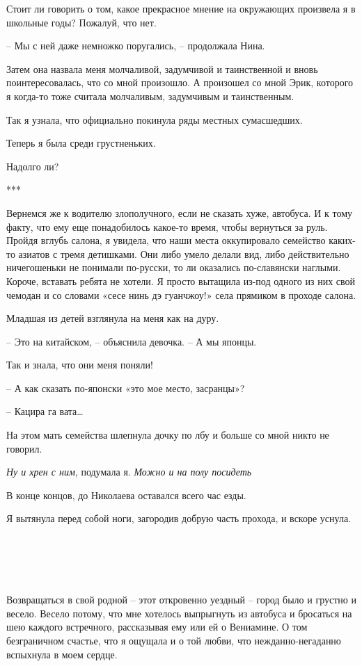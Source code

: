 \documentclass[
]{book}
\begin{document}
Стоит ли говорить о том, какое прекрасное мнение на окружающих произвела я в школьные годы? Пожалуй, что нет.

-- Мы с ней даже немножко поругались, -- продолжала Нина.

Затем она назвала меня молчаливой, задумчивой и таинственной и вновь поинтересовалась, что со мной произошло. А произошел со мной Эрик, которого я когда-то тоже считала молчаливым, задумчивым и таинственным.

Так я узнала, что официально покинула ряды местных сумасшедших.

Теперь я была среди грустненьких.

Надолго ли?

***

Вернемся же к водителю злополучного, если не сказать хуже, автобуса. И к тому факту, что ему еще понадобилось какое-то время, чтобы вернуться за руль. Пройдя вглубь салона, я увидела, что наши места оккупировало семейство каких-то азиатов с тремя детишками. Они либо умело делали вид, либо действительно ничегошеньки не понимали по-русски, то ли оказались по-славянски наглыми. Короче, вставать ребята не хотели. Я просто вытащила из-под одного из них свой чемодан и со словами «сесе нинь дэ гуанчжоу!» села прямиком в проходе салона.

Младшая из детей взглянула на меня как на дуру.

-- Это на китайском, -- объяснила девочка. -- А мы японцы.

Так и знала, что они меня поняли!

-- А как сказать по-японски «это мое место, засранцы»?

-- Кацира га вата\ldots{}

На этом мать семейства шлепнула дочку по лбу и больше со мной никто не говорил.

\emph{Ну и хрен с ним}, подумала я. \emph{Можно и на полу посидеть}

В конце концов, до Николаева оставался всего час езды.

Я вытянула перед собой ноги, загородив добрую часть прохода, и вскоре уснула.

\hypertarget{chapter-41}{%
\chapter{~}\label{chapter-41}}

Возвращаться в свой родной -- этот откровенно уездный -- город было и грустно и весело. Весело потому, что мне хотелось выпрыгнуть из автобуса и бросаться на шею каждого встречного, рассказывая ему или ей о Вениамине. О том безграничном счастье, что я ощущала и о той любви, что нежданно-негаданно вспыхнула в моем сердце.
\end{document}
